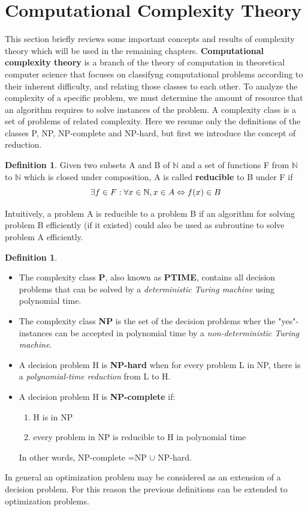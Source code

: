 \documentclass[
  twoside,
  11pt, a4paper,
  footinclude=true,
  headinclude=true,
  cleardoublepage=empty
]{scrbook}
\theoremstyle{definition}
\newtheorem{definition}[theorem]{Definition}
\begin{document}
\section{Computational Complexity Theory}
This section briefly reviews some important concepts and results of complexity theory which will be used in the remaining chapters.
\textbf{Computational complexity theory} is a branch of the theory of computation in theoretical computer science that focuses on classifyng computational problems according to their inherent difficulty, and relating those classes to each other. \newline
To analyze the complexity of a specific problem, we must determine the amount of resource that an algorithm requires to solve instances of the problem. \newline
A complexity class is a set of problems of related complexity. Here we resume only the definitions of the classes P, NP, NP-complete and NP-hard, but first we introduce the concept of reduction.
\begin{definition} Given two subsets A and B of $\mathbb{N}$ and a set of functions F from $\mathbb{N}$ to $\mathbb{N}$ which is closed under composition, A is called \textbf{reducible} to B under F if
\begin{equation} \notag
\exists f \in F : \forall x \in \mathbb{N}, x \in A \Leftrightarrow f(x) \in B
\end{equation}
\end{definition}
Intuitively, a problem A is reducible to a problem B if an algorithm for solving problem B efficiently (if it existed) could also be used as subroutine to solve problem A efficiently.
\begin{definition} \begin{itemize}
\item The complexity class \textbf{P}, also known as \textbf{PTIME}, contains all decision problems that can be solved by a \emph{deterministic Turing machine} using polynomial time.
\item The complexity class \textbf{NP} is the set of the decision problems wher the "yes"-instances can be accepted in polynomial time by a \emph{non-deterministic Turing machine}.
\item A decision problem H is \textbf{NP-hard} when for every problem L in NP, there is a \emph{polynomial-time reduction} from L to H.
\item A decision problem H is \textbf{NP-complete} if:
\begin{enumerate}
\item H is in NP
\item every problem in NP is reducible to H in polynomial time
\end{enumerate}
In other words, NP-complete =NP $\cup$ NP-hard.
\end{itemize}
\end{definition}
In general an optimization problem may be considered as an extension of a decision problem. For this reason the previous definitions can be extended to optimization problems.
\end{document}
